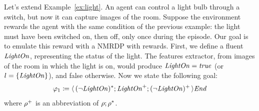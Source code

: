 \begin{example}
	Let's extend Example~\ref{ex:light}. An agent can control a light bulb
	through a switch, but now it can capture images of the room. Suppose the
	environment rewards the agent with the same condition of the previous
	example: the light must have been switched on, then off, only once during
	the episode.  Our goal is to emulate this reward with a NMRDP with \ldl{}
	rewards.  First, we define a fluent $\text{\textit{LightOn}}$, representing the
	status of the light. The features extractor, from images of the room in
	which the light is on, would produce $\text{\textit{LightOn}} = \text{\textit{true}}$ (or $l =
	\{\text{\textit{LightOn}}\}$), and false otherwise. Now we state the following
	\ldl{} goal:
	\[
		\varphi_1 \coloneqq \langle\, {(\neg \text{\textit{LightOn}})^*;
		\text{\textit{LightOn}}^+; (\neg \text{\textit{LightOn}})^+} \,\rangle \text{\textit{End}}
	\]
	where $\rho^+$ is an abbreviation of $\rho; \rho^*$.
	\label{ex:rb-light}
\end{example}

